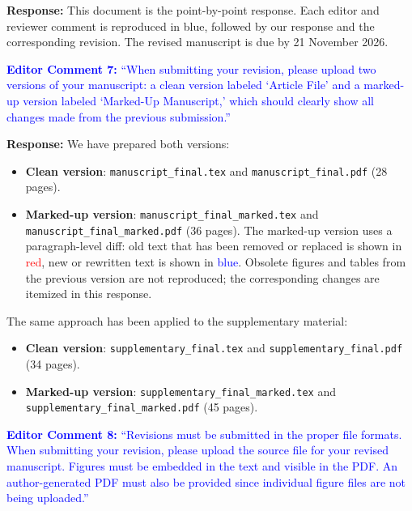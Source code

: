 \documentclass[11pt,a4paper]{article}
\newcommand{\brk}{\hspace{0pt}}
\begin{document}
\noindent\textbf{Response:} This document is the point-by-point response. Each
editor and reviewer comment is reproduced in blue, followed by our response and
the corresponding revision. The revised manuscript is due by 21 November 2026.

\vspace{1em}

\noindent\textcolor{blue}{\textbf{Editor Comment 7:} ``When submitting your
revision, please upload two versions of your manuscript: a clean version labeled
`Article File' and a marked-up version labeled `Marked-Up Manuscript,' which
should clearly show all changes made from the previous submission.''}

\vspace{0.5em}

\noindent\textbf{Response:} We have prepared both versions:
\begin{itemize}
\item \textbf{Clean version}: \texttt{manuscript\_final\brk.tex} and
  \texttt{manuscript\_final\brk.pdf} (28 pages).
\item \textbf{Marked-up version}: \texttt{manuscript\_final\brk\_marked\brk.tex} and
  \texttt{manuscript\_final\brk\_marked\brk.pdf} (36 pages). The marked-up version uses
  a paragraph-level diff: old text that has been removed or replaced is shown in
  \textcolor{red}{red}, new or rewritten text is shown in
  \textcolor{blue}{blue}. Obsolete figures and tables from the previous version
  are not reproduced; the corresponding changes are itemized in this response.
\end{itemize}

The same approach has been applied to the supplementary material:
\begin{itemize}
\item \textbf{Clean version}: \texttt{supplementary\_final\brk.tex} and
  \texttt{supplementary\_final\brk.pdf} (34 pages).
\item \textbf{Marked-up version}: \texttt{supplementary\_final\brk\_marked\brk.tex} and
  \texttt{supplementary\_final\brk\_marked\brk.pdf} (45 pages).
\end{itemize}

\vspace{1em}

\noindent\textcolor{blue}{\textbf{Editor Comment 8:} ``Revisions must be
submitted in the proper file formats. When submitting your revision, please
upload the source file for your revised manuscript. Figures must be embedded in
the text and visible in the PDF. An author-generated PDF must also be provided
since individual figure files are not being uploaded.''}
\end{document}
